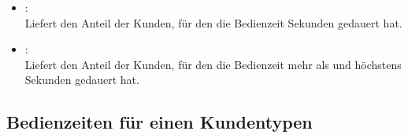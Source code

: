 \begin{itemize}
\item
{}:\\
Liefert den Anteil der Kunden, für den die Bedienzeit  Sekunden gedauert hat.

\item
{}:\\
Liefert den Anteil der Kunden, für den die Bedienzeit mehr als  und höchstens  Sekunden gedauert hat.

\end{itemize}



\subsection{Bedienzeiten für einen Kundentypen}

